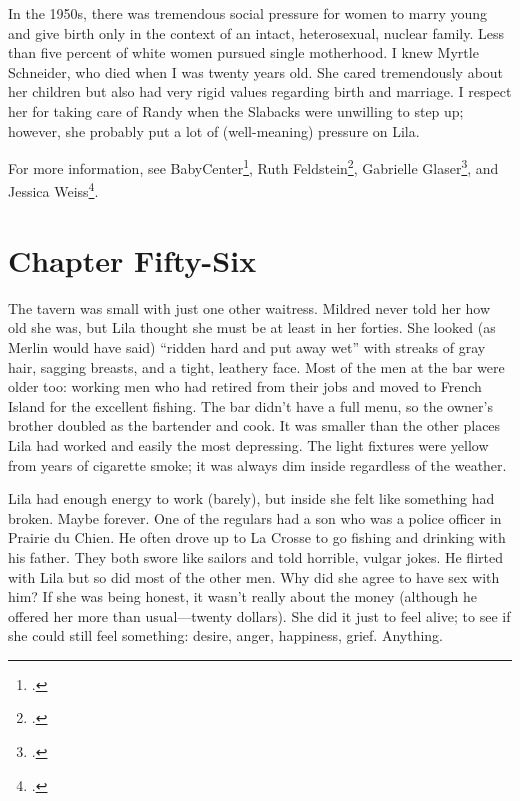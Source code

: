 \documentclass[
  letterpaper,
]{book}
\begin{document}
In the 1950s, there was tremendous social pressure for women to marry
young and give birth only in the context of an intact, heterosexual,
nuclear family. Less than five percent of white women pursued single
motherhood. I knew Myrtle Schneider, who died when I was twenty years
old. She cared tremendously about her children but also had very rigid
values regarding birth and marriage. I respect her for taking care of
Randy when the Slabacks were unwilling to step up; however, she probably
put a lot of (well-meaning) pressure on Lila.

For more information, see BabyCenter\footnote{.},
Ruth Feldstein\footnote{.}, Gabrielle
Glaser\footnote{.}, and Jessica Weiss\footnote{.}.


\chapter{Chapter Fifty-Six}\label{chapter-fifty-six}

The tavern was small with just one other waitress. Mildred never told
her how old she was, but Lila thought she must be at least in her
forties. She looked (as Merlin would have said) ``ridden hard and put
away wet'' with streaks of gray hair, sagging breasts, and a tight,
leathery face. Most of the men at the bar were older too: working men
who had retired from their jobs and moved to French Island for the
excellent fishing. The bar didn't have a full menu, so the owner's
brother doubled as the bartender and cook. It was smaller than the other
places Lila had worked and easily the most depressing. The light
fixtures were yellow from years of cigarette smoke; it was always dim
inside regardless of the weather.

Lila had enough energy to work (barely), but inside she felt like
something had broken. Maybe forever. One of the regulars had a son who
was a police officer in Prairie du Chien. He often drove up to La Crosse
to go fishing and drinking with his father. They both swore like sailors
and told horrible, vulgar jokes. He flirted with Lila but so did most of
the other men. Why did she agree to have sex with him? If she was being
honest, it wasn't really about the money (although he offered her more
than usual---twenty dollars). She did it just to feel alive; to see if
she could still feel something: desire, anger, happiness, grief.
Anything.
\end{document}
